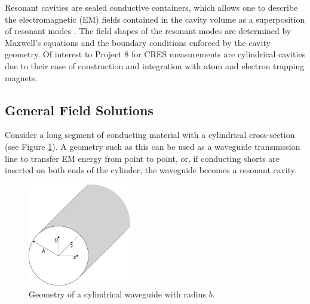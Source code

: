 Resonant cavities are sealed conductive containers, which allows one to describe the electromagnetic (EM) fields contained in the cavity volume as a superposition of resonant modes \cite{pozar}. The field shapes of the resonant modes are determined by Maxwell's equations and the boundary conditions enforced by the cavity geometry. Of interest to Project 8 for CRES measurements are cylindrical cavities due to their ease of construction and integration with atom and electron trapping magnets. 

\subsection{General Field Solutions}

Consider a long segment of conducting material with a cylindrical cross-section (see Figure \ref{fig:chap6-circ-waveguide}). A geometry such as this can be used as a waveguide transmission line to transfer EM energy from point to point, or, if conducting shorts are inserted on both ends of the cylinder, the waveguide becomes a resonant cavity. 

\begin{figure}[htbp]
    \centering
    \includegraphics*[width=0.4\textwidth]{figs/Chapter-6/230606_circular_waveguide.png}
    \caption{\label{fig:chap6-circ-waveguide} Geometry of a cylindrical waveguide with radius $b$. }
\end{figure}

